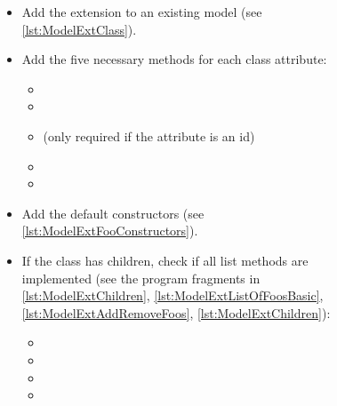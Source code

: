\begin{figure}[htb]
  \begin{framed}
    \begin{itemize}[label=$\Box$,leftmargin=2em]

    \item Add the extension to an existing model (see
      \vref{lst:ModelExtClass}).

    \item Add the five necessary methods for each class attribute:

      \begin{itemize}[label=$\Box$]
        
      \item {}
        
      \item {}
        
      \item {} (only required if the attribute is an id)
        
      \item {}
        
      \item {}

      \end{itemize}

    \item Add the default constructors (see \vref{lst:ModelExtFooConstructors}).

    \item If the class has children, check if all list methods are implemented
      (see the program fragments in \ref{lst:ModelExtChildren},
      \ref{lst:ModelExtListOfFoosBasic}, \ref{lst:ModelExtAddRemoveFoos},
      \ref{lst:ModelExtChildren}):

      \begin{itemize}[label=$\Box$]
        
      \item {}
        
      \item {}
        
      \item {}
        
      \item {}
        

\end{itemize}
\end{itemize}
\end{framed}
\end{figure}
